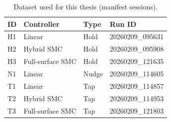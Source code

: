 \begin{table}[htbp]
\centering
\small
\setlength{\tabcolsep}{4pt}
\caption{Dataset used for this thesis (manifest sessions).}
\label{tab:dataset_manifest}
\begin{tabular}{llll}
\toprule
ID & Controller & Type & Run ID \\
\midrule
H1 & Linear & Hold & 20260209\_095631 \\
H2 & Hybrid SMC & Hold & 20260209\_095908 \\
H3 & Full-surface SMC & Hold & 20260209\_121635 \\
N1 & Linear & Nudge & 20260209\_114605 \\
T1 & Linear & Tap & 20260209\_114857 \\
T2 & Hybrid SMC & Tap & 20260209\_114953 \\
T3 & Full-surface SMC & Tap & 20260209\_121803 \\
\bottomrule
\end{tabular}
\end{table}

